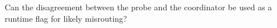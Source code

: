 \begin{rqbox}[RQ4]
Can the disagreement between the probe and the coordinator be used as a runtime flag for likely misrouting?
\end{rqbox}
